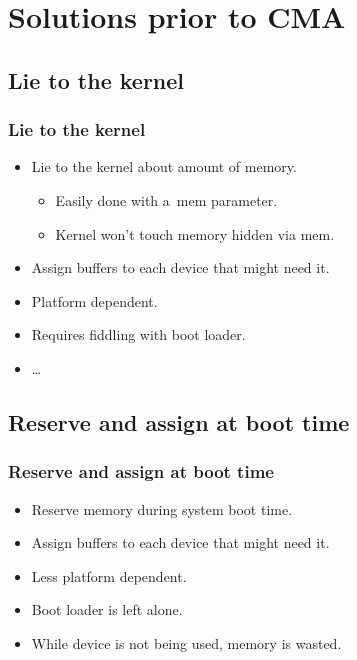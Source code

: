 \section[Solutions]{Solutions prior to CMA}

\subsection{Lie to the kernel}
\begin{frame}
  \frametitle{Lie to the kernel}

  \begin{itemize}
  \item Lie to the kernel about amount of memory.
    \begin{itemize}
    \item Easily done with a~mem parameter.
    \item Kernel won't touch memory hidden via mem.
    \end{itemize}
  \item Assign buffers to each device that might need it.
  \item Platform dependent.
  \item Requires fiddling with boot loader.
  \item \ldots
  \end{itemize}
\end{frame}

\subsection{Reserve and assign at boot time}
\begin{frame}
  \frametitle{Reserve and assign at boot time}

  \begin{itemize}
  \item Reserve memory during system boot time.
  \item Assign buffers to each device that might need it.
  \item Less platform dependent.
  \item Boot loader is left alone.
  \item While device is not being used, memory is wasted.
  \end{itemize}
\end{frame}


